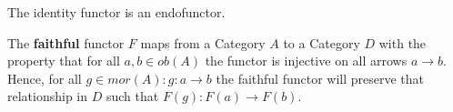 \documentclass{article}
\begin{document}
\begin{corollary}
  The identity functor is an endofunctor.
\end{corollary}
\begin{definition}
    The \textbf{faithful} functor $F$ maps from a Category $A$ to a Category $D$ with the property that for all $a,b \in ob(A)$ the functor is injective on all arrows $a \to b$. Hence, for all $g \in mor(A): g: a \to b$ the faithful functor will preserve that relationship in $D$ such that $F(g): F(a) \to F(b)$.
\end{definition}



\end{document}
